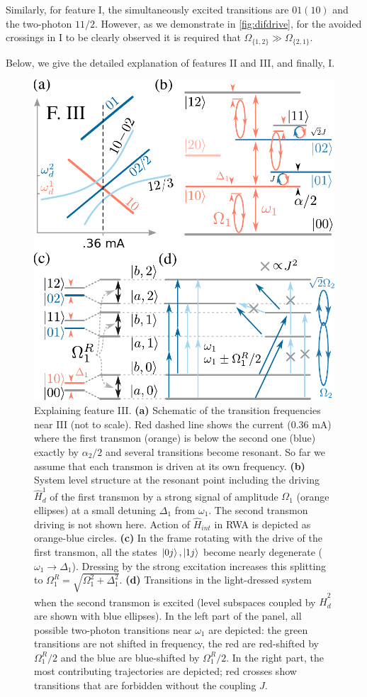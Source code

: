 \documentclass[%
 prx,
 amsmath,amssymb,
 reprint,%
]{revtex4-1}
\begin{document}
Similarly, for feature I, the simultaneously excited transitions are $01(10)$ and the two-photon $11/2$. However, as we demonstrate in \autoref{fig:difdrive}, for the avoided crossings in I to be clearly observed it is required that $\Omega_{\{1,2\}} \gg \Omega_{\{2,1\}}$. 

Below, we give the detailed explanation of features II and III, and finally, I.

\begin{figure}
	\centering
	\includegraphics[width=\linewidth]{main_scheme_2}  
	\caption{Explaining feature III. \textbf{(a)} Schematic of the transition frequencies near III (not to scale). Red dashed line shows the current (0.36 mA) where the first transmon (orange) is below the second one (blue) exactly by $\alpha_2/2$ and several transitions become resonant. So far we assume that each transmon is driven at its own frequency. \textbf{(b)} System level structure at the resonant point including the driving $\hat H_{d}^1$ of the first transmon by a strong signal of amplitude $\Omega_1$ (orange ellipses) at a small detuning $\Delta_1$ from $\omega_1$. The second transmon driving is not shown here. Action of $\hat H_{int}$ in RWA is depicted as orange-blue circles. \textbf{(c)} In the frame rotating with the drive of the first transmon, all the states $\ket{0j},\ket{1j}$ become nearly degenerate ($\omega_1 \rightarrow \Delta_1$). Dressing by the strong excitation increases this splitting to $\Omega_1^R = \sqrt{\Omega_1^2 + \Delta_1^2}$. \textbf{(d)} Transitions in the light-dressed system when the second transmon is excited (level subspaces coupled by $\hat H_{d}^2$ are shown with blue ellipses). In the left part of the panel, all possible two-photon transitions near $\omega_1$ are depicted: the green transitions are not shifted in frequency, the red are red-shifted by $\Omega^R_1/2$ and the blue are blue-shifted by $\Omega^R_1/2$. In the right part, the most contributing trajectories are depicted; red crosses show transitions that are forbidden without the coupling $J$.}

\end{figure}
\end{document}
